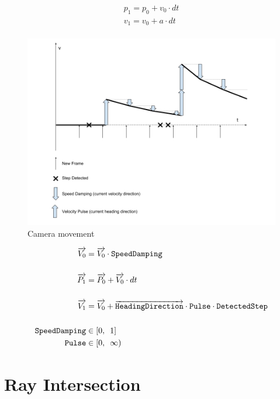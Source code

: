 \[
\begin{array}{lr}
p_1 = p_0 + v_0 \cdot dt\\
v_1 = v_0 + a \cdot dt\\
\end{array}
\]

\begin{figure}[H]
\caption{Camera movement}
\label{fig:camera-movement}
\centering
\includegraphics[width=\textwidth, keepaspectratio]{Figures/camera-movement.png}
\decoRule
\end{figure}

\[
\begin{array}{lr}
\begin{aligned}
\overrightarrow{V_0} &= \overrightarrow{V_0} \cdot \texttt{SpeedDamping}\\\\
\overrightarrow{P_1} &= \overrightarrow{P_0} + \overrightarrow{V_0} \cdot dt\\\\
\overrightarrow{V_1} &= \overrightarrow{V_0} + \overrightarrow{\texttt{HeadingDirection}} \cdot \texttt{Pulse} \cdot \texttt{DetectedStep}\\\\
\texttt{SpeedDamping} &\in [0,\enspace1]\\
\texttt{Pulse} &\in [0,\enspace \infty)\\
\end{aligned}
\end{array}
\]

\section{Ray Intersection}

